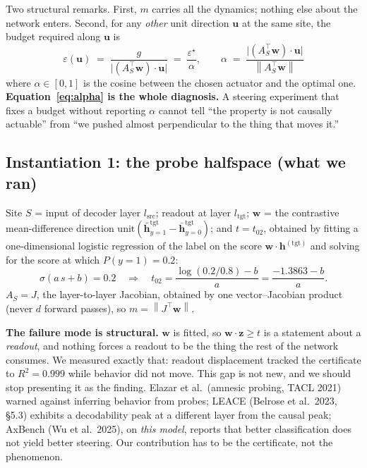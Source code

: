 \documentclass[11pt]{article}
\newcommand{\vh}{\bm{h}}
\newcommand{\vz}{\bm{z}}
\newcommand{\vw}{\bm{w}}
\newcommand{\vu}{\bm{u}}
\newcommand{\norm}[1]{\left\lVert #1 \right\rVert}
\begin{document}
Two structural remarks. First, $m$ carries all the dynamics; nothing else about the
network enters. Second, for any \emph{other} unit direction $\vu$ at the same site,
the budget required along $\vu$ is
\begin{equation}
  \varepsilon(\vu) \;=\; \frac{g}{\lvert (A_S^{\!\top}\vw)\cdot \vu \rvert}
  \;=\; \frac{\varepsilon^\star}{\alpha}, \qquad
  \alpha \;=\; \frac{\lvert (A_S^{\!\top}\vw)\cdot\vu\rvert}{\norm{A_S^{\!\top}\vw}}
  \label{eq:alpha}
\end{equation}
where $\alpha \in [0,1]$ is the cosine between the chosen actuator and the optimal
one. \textbf{Equation~\eqref{eq:alpha} is the whole diagnosis.} A steering experiment
that fixes a budget without reporting $\alpha$ cannot tell ``the property is not
causally actuable'' from ``we pushed almost perpendicular to the thing that moves it.''

\subsection{Instantiation 1: the probe halfspace (what we ran)}

Site $S$ = input of decoder layer $l_{\mathrm{src}}$; readout at layer
$l_{\mathrm{tgt}}$; $\vw$ = the contrastive mean-difference direction
$\mathrm{unit}\!\left(\bar{\vh}^{\mathrm{tgt}}_{y=1} -
\bar{\vh}^{\mathrm{tgt}}_{y=0}\right)$; and $t = t_{02}$, obtained by fitting a
one-dimensional logistic regression of the label on the score $\vw\cdot\vh^{(\mathrm{tgt})}$
and solving for the score at which $P(y{=}1) = 0.2$:
\begin{equation}
  \sigma(a\,s + b) = 0.2 \quad\Longrightarrow\quad
  t_{02} = \frac{\log(0.2/0.8) - b}{a} = \frac{-1.3863 - b}{a}.
  \label{eq:t02}
\end{equation}
$A_S = J$, the layer-to-layer Jacobian, obtained by one vector--Jacobian product
(never $d$ forward passes), so $m = \norm{J^{\!\top}\vw}$.

\textbf{The failure mode is structural.} $\vw$ is fitted, so $\vw\cdot\vz \ge t$ is a
statement about a \emph{readout}, and nothing forces a readout to be the thing the
rest of the network consumes. We measured exactly that: readout displacement tracked
the certificate to $R^2 = 0.999$ while behavior did not move. This gap is not new,
and we should stop presenting it as the finding. Elazar et al.\ (amnesic probing,
TACL 2021) warned against inferring behavior from probes; LEACE (Belrose et al.\ 2023,
\S5.3) exhibits a decodability peak at a different layer from the causal peak; AxBench
(Wu et al.\ 2025), on \emph{this model}, reports that better classification does not
yield better steering. Our contribution has to be the certificate, not the phenomenon.
\end{document}
